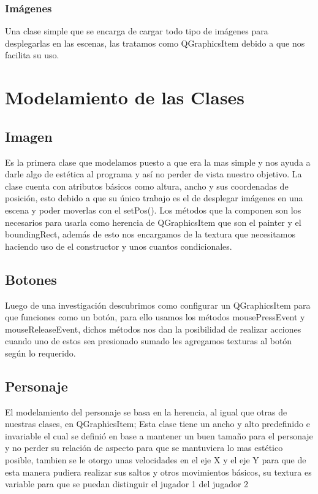 \documentclass{article}
\begin{document}
            \subsubsection{Imágenes}
            Una clase simple que se encarga de cargar todo tipo de imágenes para desplegarlas en las escenas, las tratamos como QGraphicsItem debido a que nos facilita su uso.
    
\section{Modelamiento de las Clases}
    \subsection{Imagen}
    Es la primera clase que modelamos puesto a que era la mas simple y nos ayuda a darle algo de estética al programa y así no perder de vista nuestro objetivo. La clase cuenta con atributos básicos como altura, ancho y sus coordenadas de posición, esto debido a que su único trabajo es el de desplegar imágenes en una escena y poder moverlas con el setPos(). Los métodos que la componen son los necesarios para usarla como herencia de QGraphicsItem que son el painter y el boundingRect, además de esto nos encargamos de la textura que necesitamos haciendo uso de el constructor y unos cuantos condicionales.
    
    \subsection{Botones}
    Luego de una investigación descubrimos como configurar un QGraphicsItem para que funciones como un botón, para ello usamos los métodos mousePressEvent y mouseReleaseEvent, dichos métodos nos dan la posibilidad de realizar acciones cuando uno de estos sea presionado sumado les agregamos texturas al botón según lo requerido. 
    
    \subsection{Personaje}
    El modelamiento del personaje se basa en la herencia, al igual que otras de nuestras clases, en QGraphicsItem; Esta clase tiene un ancho y alto predefinido e invariable el cual se definió en base a mantener un buen tamaño para el personaje y no perder su relación de aspecto para que se mantuviera lo mas estético posible, tambien se le otorgo unas velocidades en el eje X y el eje Y para que de esta manera pudiera realizar sus saltos y otros movimientos básicos, su textura es variable para que se puedan distinguir el jugador 1 del jugador 2
        
\end{document}
